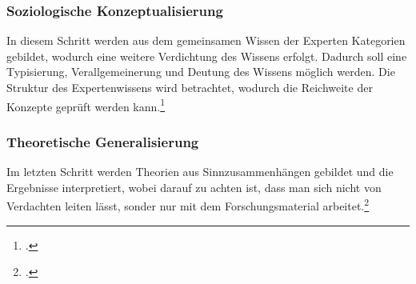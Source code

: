 %
\subsubsection{Soziologische Konzeptualisierung}
In diesem Schritt werden aus dem gemeinsamen Wissen der Experten Kategorien gebildet, wodurch eine weitere Verdichtung des Wissens erfolgt. Dadurch soll eine Typisierung, Verallgemeinerung und Deutung des Wissens möglich werden. Die Struktur des Expertenwissens wird betrachtet, wodurch die Reichweite der Konzepte geprüft werden kann.\footcite[Vgl.][S. 462 f.]{Meuser_1991_Interview}

\subsubsection{Theoretische Generalisierung}
Im letzten Schritt werden Theorien aus Sinnzusammenhängen gebildet und die Ergebnisse interpretiert, wobei darauf zu achten ist, dass man sich nicht von Verdachten leiten lässt, sonder nur mit dem Forschungsmaterial arbeitet.\footcite[Vgl.][S. 463 ff.]{Meuser_1991_Interview}




